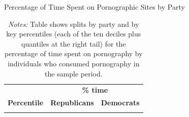 \documentclass[12pt, letterpaper]{article}
\begin{document}
\begin{table}[ht] \centering \small \setlength\tabcolsep{10 pt}
	\caption{Percentage of Time Spent on Pornographic Sites by Party}
	\label{tab:distribution_prop_duration_party}
	\begin{adjustbox}{max width=\textwidth}
		\begin{tabular}{crr}
			\toprule
			\multicolumn{1}{l}{\textbf{}}&\multicolumn{2}{c}{\textbf{\% time}}\\
			\cmidrule(l){2-3}
			\multicolumn{1}{l}{\textbf{Percentile}}&\multicolumn{1}{c}{\textbf{Republicans}}&\multicolumn{1}{c}{\textbf{Democrats}}\\
			\midrule
			\\
			\bottomrule
		\end{tabular}
	\end{adjustbox}
	\caption*{\footnotesize \emph{Notes:} 
		Table shows splits by party and by key percentiles (each of the ten deciles plus quantiles at the right tail) for the percentage of time spent on pornography by individuals who consumed pornography in the sample period. 
	}
\end{table}

\FloatBarrier
\end{document}
